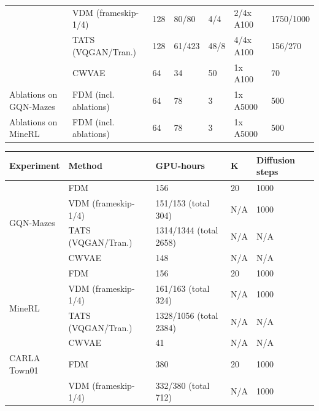 \begin{table}[t]
\begin{tabular}{p{1.1cm}llp{0.9cm}p{0.6cm}lp{1cm}}
                                       &  VDM (frameskip-1/4)       & 128   & 80/80 & 4/4   & 2/4x A100 & 1750/1000  \\
                                       &  TATS (VQGAN/Tran.)       & 128    & 61/423    & 48/8   & 4/4x A100   & 156/270    \\
                                       &  CWVAE                     & 64    & 34    & 50    & 1x A100   & 70      \\
   \midrule
    Ablations on GQN-Mazes   &  FDM (incl. ablations)     & 64    & 78    & 3     & 1x A5000  & 500   \\
   \midrule
    Ablations on MineRL  &  FDM (incl. ablations)     & 64    & 78    & 3     & 1x A5000  & 500       \\
    \bottomrule
  \end{tabular}
  \begin{tabular}{p{1.1cm}lllp{0.7cm}}
    \toprule
     Experiment  & Method  &  GPU-hours &  K  & Diffusion steps   \\
    \midrule
    \multirow{4}{*}{GQN-Mazes}         &  FDM                       & 156      & 20    & 1000      \\
                                       &  VDM (frameskip-1/4)       & 151/153 (total 304)   & N/A  & 1000      \\
                                       &  TATS (VQGAN/Tran.)       & 1314/1344 (total 2658)    & N/A  & N/A      \\
                                       &  CWVAE                     & 148   & N/A   & N/A       \\
   \midrule
    \multirow{4}{*}{MineRL}            &  FDM                       & 156      & 20    & 1000      \\
                                       &  VDM (frameskip-1/4)       & 161/163 (total 324)   & N/A  & 1000      \\
                                       &  TATS (VQGAN/Tran.)       & 1328/1056 (total 2384)     & N/A  & N/A      \\
                                       &  CWVAE                     & 41    & N/A    & N/A      \\
    \midrule
    \multirowcell{4}[0pt][l]{CARLA\\Town01}
                                       &  FDM                       & 380   & 20    & 1000      \\
                                       &  VDM (frameskip-1/4)       & 332/380 (total 712)   & N/A  & 1000      \\

\end{tabular}
\end{table}
